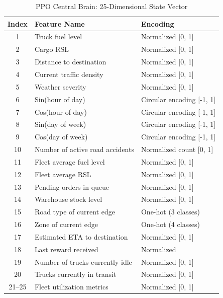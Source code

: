 \begin{table}[h!]
\centering
\caption{PPO Central Brain: 25-Dimensional State Vector}
\label{tab:ppo_state}
\begin{tabular}{|c|l|l|}
\hline
\textbf{Index} & \textbf{Feature Name}             & \textbf{Encoding} \\
\hline
1  & Truck fuel level                  & Normalized [0, 1]              \\
2  & Cargo RSL                         & Normalized [0, 1]              \\
3  & Distance to destination           & Normalized [0, 1]              \\
4  & Current traffic density           & Normalized [0, 1]              \\
5  & Weather severity                  & Normalized [0, 1]              \\
6  & Sin(hour of day)                  & Circular encoding [-1, 1]      \\
7  & Cos(hour of day)                  & Circular encoding [-1, 1]      \\
8  & Sin(day of week)                  & Circular encoding [-1, 1]      \\
9  & Cos(day of week)                  & Circular encoding [-1, 1]      \\
10 & Number of active road accidents   & Normalized count [0, 1]        \\
11 & Fleet average fuel level          & Normalized [0, 1]              \\
12 & Fleet average RSL                 & Normalized [0, 1]              \\
13 & Pending orders in queue           & Normalized [0, 1]              \\
14 & Warehouse stock level             & Normalized [0, 1]              \\
15 & Road type of current edge         & One-hot (3 classes)            \\
16 & Zone of current edge              & One-hot (4 classes)            \\
17 & Estimated ETA to destination      & Normalized [0, 1]              \\
18 & Last reward received              & Normalized                     \\
19 & Number of trucks currently idle   & Normalized [0, 1]              \\
20 & Trucks currently in transit       & Normalized [0, 1]              \\
21--25 & Fleet utilization metrics     & Normalized [0, 1]              \\
\hline
\end{tabular}
\end{table}

